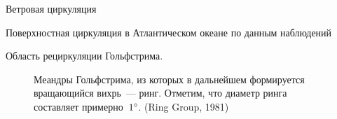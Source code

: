 \begin{chapter}{Ветровая циркуляция}
\begin{section}{Поверхностная циркуляция в Атлантическом океане по данным наблюдений}
\begin{paragraph}{Область рециркуляции Гольфстрима.}
\begin{figure}[t!]
\caption{Меандры Гольфстрима, из которых в дальнейшем формируется вращающийся
вихрь~--- ринг. Отметим, что диаметр ринга составляет 
примерно~${1}^\circ$. (Ring Group, 1981)}
\label{fig:ringformation}
\end{figure}
%
%


\end{paragraph}
\end{section}
\end{chapter}
